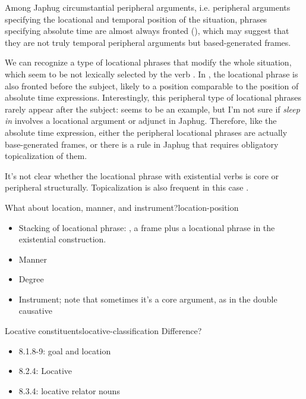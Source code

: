 \documentclass[a4paper, oneside, 12pt]{report}
\newcommand*{\citepage}[1]{p.~{#1}}
\newcommand{\form}[1]{\emph{#1}}
\begin{document}
Among Japhug circumstantial peripheral arguments,
i.e. peripheral arguments specifying the locational and temporal position of the situation,
phrases specifying absolute time are almost always fronted
(),
which may suggest that they are not truly temporal peripheral arguments 
but based-generated frames.

We can recognize a type of locational phrases that modify the whole situation,
which seem to be not lexically selected by the verb
\citep[\citepage{304}, (33); \citepage{387}, (66); \citepage{639}, (31)]{jacques2021grammar}.
In \citet[\citepage{387}, (66)]{jacques2021grammar},
the locational phrase is also fronted before the subject,
likely to a position comparable to the position of absolute time expressions.
Interestingly, this peripheral type of locational phrases
rarely appear after the subject:
\citep[\citepage{1220}, (115)]{jacques2021grammar} seems to be an example,
but I'm not sure if \form{sleep in} involves a locational argument or adjunct in Japhug. 
Therefore, like the absolute time expression,
either the peripheral locational phrases are actually base-generated frames,
or there is a rule in Japhug that requires obligatory topicalization of them. 

It's not clear whether the locational phrase with existential verbs 
is core or peripheral structurally.
Topicalization is also frequent in this case \citealt[\citepage{369}, (9)]{jacques2021grammar}.

\begin{todobox}{What about location, manner, and instrument?}{location-position}
    \begin{itemize}        
        \item Stacking of locational phrase:
        \citet[\citepage{284}, (125)]{jacques2021grammar},
        a frame plus a locational phrase in the existential construction.
        \item Manner
        \item Degree
        \item Instrument; note that sometimes it's a core argument, as in the double causative
    \end{itemize}    
\end{todobox}

\begin{todobox}{Locative constituents}{locative-classification}
    Difference?
    \begin{itemize}
        \item 8.1.8-9: goal and location
        \item 8.2.4: Locative
        \item 8.3.4: locative relator nouns
    \end{itemize}
\end{todobox}
\end{document}
